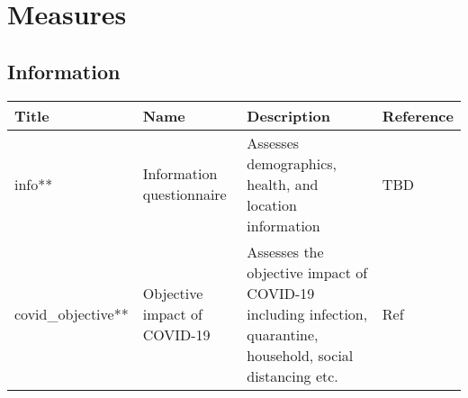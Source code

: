 \documentclass[]{book}
\begin{document}
\hypertarget{measures}{%
\section{Measures}\label{measures}}

\hypertarget{information}{%
\subsection{Information}\label{information}}

\begin{longtable}[]{@{}llll@{}}
\toprule
\begin{minipage}[b]{0.22\columnwidth}\raggedright
Title\strut
\end{minipage} & \begin{minipage}[b]{0.27\columnwidth}\raggedright
Name\strut
\end{minipage} & \begin{minipage}[b]{0.22\columnwidth}\raggedright
Description\strut
\end{minipage} & \begin{minipage}[b]{0.18\columnwidth}\raggedright
Reference\strut
\end{minipage}\tabularnewline
\midrule
\endhead
\begin{minipage}[t]{0.22\columnwidth}\raggedright
info**\strut
\end{minipage} & \begin{minipage}[t]{0.27\columnwidth}\raggedright
Information questionnaire\strut
\end{minipage} & \begin{minipage}[t]{0.22\columnwidth}\raggedright
Assesses demographics, health, and location information\strut
\end{minipage} & \begin{minipage}[t]{0.18\columnwidth}\raggedright
TBD\strut
\end{minipage}\tabularnewline
\begin{minipage}[t]{0.22\columnwidth}\raggedright
covid\_objective**\strut
\end{minipage} & \begin{minipage}[t]{0.27\columnwidth}\raggedright
Objective impact of COVID-19\strut
\end{minipage} & \begin{minipage}[t]{0.22\columnwidth}\raggedright
Assesses the objective impact of COVID-19 including infection, quarantine, household, social distancing etc.\strut
\end{minipage} & \begin{minipage}[t]{0.18\columnwidth}\raggedright
Ref\strut
\end{minipage}\tabularnewline
\bottomrule
\end{longtable}
\end{document}
